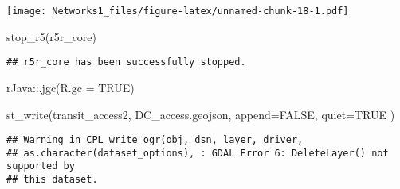 \documentclass[
]{article}
\newenvironment{Shaded}{\begin{snugshade}}{\end{snugshade}}
\newcommand{\AttributeTok}[1]{\textcolor[rgb]{0.77,0.63,0.00}{#1}}
\newcommand{\ConstantTok}[1]{\textcolor[rgb]{0.00,0.00,0.00}{#1}}
\newcommand{\FunctionTok}[1]{\textcolor[rgb]{0.00,0.00,0.00}{#1}}
\newcommand{\NormalTok}[1]{#1}
\newcommand{\SpecialCharTok}[1]{\textcolor[rgb]{0.00,0.00,0.00}{#1}}
\newcommand{\StringTok}[1]{\textcolor[rgb]{0.31,0.60,0.02}{#1}}
\begin{document}
\texttt{[image: Networks1\_files/figure-latex/unnamed-chunk-18-1.pdf]}

\begin{Shaded}
\begin{Highlighting}[]
\FunctionTok{stop\_r5}\NormalTok{(r5r\_core)}
\end{Highlighting}
\end{Shaded}

\begin{verbatim}
## r5r_core has been successfully stopped.
\end{verbatim}

\begin{Shaded}
\begin{Highlighting}[]
\NormalTok{rJava}\SpecialCharTok{::}\FunctionTok{.jgc}\NormalTok{(}\AttributeTok{R.gc =} \ConstantTok{TRUE}\NormalTok{)}
\end{Highlighting}
\end{Shaded}

\begin{Shaded}
\begin{Highlighting}[]
\FunctionTok{st\_write}\NormalTok{(transit\_access2, }\StringTok{\textquotesingle{}DC\_access.geojson\textquotesingle{}}\NormalTok{, }\AttributeTok{append=}\ConstantTok{FALSE}\NormalTok{, }\AttributeTok{quiet=}\ConstantTok{TRUE}\NormalTok{ )}
\end{Highlighting}
\end{Shaded}

\begin{verbatim}
## Warning in CPL_write_ogr(obj, dsn, layer, driver,
## as.character(dataset_options), : GDAL Error 6: DeleteLayer() not supported by
## this dataset.
\end{verbatim}
\end{document}
